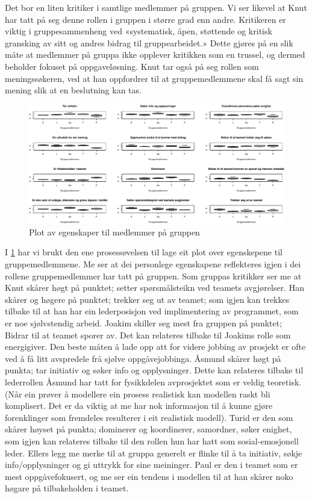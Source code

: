 Det bor en liten kritiker i samtlige medlemmer på gruppen. Vi ser likevel at Knut har tatt på 
seg denne rollen i gruppen i større grad enn andre. Kritikeren er viktig i gruppesammenheng 
ved «systematisk, åpen, støttende og kritisk gransking av sitt og andres bidrag til gruppearbeidet.»
Dette gjøres på en slik måte at medlemmer på gruppa ikke opplever kritikken som en trussel, 
og dermed beholder fokuset på oppgaveløsning. Knut tar også på seg rollen som meningssøkeren, 
ved at han oppfordrer til at gruppemedlemmene skal få sagt sin mening slik at en beslutning
kan tas.\\

\begin{figure}[ht!]
\centering
\includegraphics[scale=0.4]{teammedlem.pdf}
\caption{Plot av egenskaper til medlemmer på gruppen}
\label{fig:medlemmer}
\end{figure}

I \cref{fig:medlemmer} har vi brukt den ene prosessøvelsen til 
lage eit plot over egenskepene til gruppemedlemmene. Me ser at dei personlege egenskapene reflekteres 
igjen i dei rollene gruppemedlemmer har tatt på gruppen. Som gruppas kritikker ser me at Knut skårer 
høgt på punktet; setter spørsmålsteikn ved teamets avgjørelser. Han skårer og høgere på punktet; trekker
seg ut av teamet; som igjen kan trekkes tilbake til at han har ein lederposisjon ved implimentering av
programmet, som er noe sjølvstendig arbeid. Joakim skiller seg mest fra gruppen på punktet; Bidrar til at teamet 
sporer av. Det kan relateres tilbake til Joakims rolle som energigiver. Den beste måten å lade opp att
for videre jobbing av prosjekt er ofte ved å få litt avspredele frå sjølve oppgåvejobbinga.
Åsmund skårer høgt på punkta; tar initiativ og søker info og opplysninger. Dette kan relateres tilbake 
til lederrollen Åsmund har tatt for fysikkdelen avprosjektet som er veldig teoretisk. (Når ein prøver å 
modellere ein prosess realistisk kan modellen raskt bli komplisert. Det er da viktig  at me har nok 
informasjon til å kunne gjøre forenklinger som fremdeles resulterer i eit realistisk modell).
Turid er den som skårer høyset på punkta; dominerer og koordinerer, samordner, søker enighet, som igjen kan
relateres tilbake til den rollen hun har hatt som sosial-emosjonell leder. Ellers legg me merke til at gruppa
generelt er flinke til å ta initiativ, søkje info/opplysninger og gi uttrykk for sine meininger. Paul er den 
i teamet som er mest oppgåvefokusert, og me ser ein tendens i modellen til at han skårer noko høgare på 
tilbakeholden i teamet.


